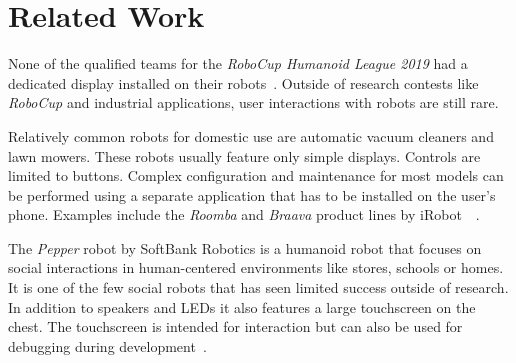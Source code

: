 \chapter{Related Work}
\label{related-work}

None of the qualified teams for the \textit{RoboCup Humanoid League 2019} had a dedicated display
installed on their robots~\cite{robocup-humanoid-teams}. Outside of research contests like
\textit{RoboCup} and industrial applications, user interactions with robots are still rare.
\bigbreak

Relatively common robots for domestic use are automatic vacuum cleaners and lawn mowers. These robots
usually feature only simple displays. Controls are limited to buttons. Complex configuration and
maintenance for most models can be performed using a separate application that has to be installed on
the user's phone. Examples include the \textit{Roomba} and \textit{Braava} product lines by iRobot~\
\cite{irobot-website}.

The \textit{Pepper} robot by SoftBank Robotics is a humanoid robot that focuses on social interactions
in human-centered environments like stores, schools or homes. It is one of the few social robots that
has seen limited success outside of research. In addition to speakers and LEDs it also features a
large touchscreen on the chest. The touchscreen is intended for interaction but can also be used for
debugging during development~\cite{pepper-robot}.

